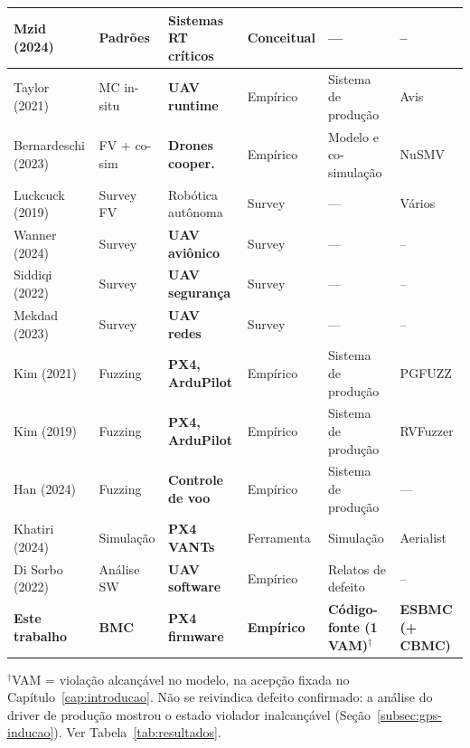 \begin{table}[p]
\begin{tabular}{|p{2.5cm}|p{2.0cm}|p{2.2cm}|p{1.7cm}|p{2.1cm}|p{1.6cm}|}
Mzid (2024)         & Padrões         & Sistemas RT críticos    & Conceitual & ---                   & --        \\ \hline
Taylor (2021)       & MC in-situ      & \textbf{UAV runtime}    & Empírico   & Sistema de produção   & Avis      \\ \hline
Bernardeschi (2023) & FV + co-sim     & \textbf{Drones cooper.} & Empírico   & Modelo e co-simulação & NuSMV     \\ \hline
Luckcuck (2019)     & Survey FV       & Robótica autônoma       & Survey     & ---                   & Vários    \\ \hline
Wanner (2024)       & Survey          & \textbf{UAV aviônico}   & Survey     & ---                   & --        \\ \hline
Siddiqi (2022)      & Survey          & \textbf{UAV segurança}  & Survey     & ---                   & --        \\ \hline
Mekdad (2023)       & Survey          & \textbf{UAV redes}      & Survey     & ---                   & --        \\ \hline
Kim (2021)          & Fuzzing         & \textbf{PX4, ArduPilot} & Empírico   & Sistema de produção   & PGFUZZ    \\ \hline
Kim (2019)          & Fuzzing         & \textbf{PX4, ArduPilot} & Empírico   & Sistema de produção   & RVFuzzer  \\ \hline
Han (2024)          & Fuzzing         & \textbf{Controle de voo}& Empírico   & Sistema de produção   & ---       \\ \hline
Khatiri (2024)      & Simulação       & \textbf{PX4 VANTs}      & Ferramenta & Simulação             & Aerialist \\ \hline
Di Sorbo (2022)     & Análise SW      & \textbf{UAV software}   & Empírico   & Relatos de defeito    & --        \\ \hline
\textbf{Este trabalho} & \textbf{BMC} & \textbf{PX4 firmware}   & \textbf{Empírico} & \textbf{Código-fonte (1 VAM)$^\dagger$} & \textbf{ESBMC (+ CBMC)} \\ \hline
\end{tabular}

\scriptsize
\begin{flushleft}
$^\dagger$VAM = violação alcançável no modelo, na acepção fixada no
Capítulo~\ref{cap:introducao}. Não se reivindica defeito confirmado: a análise do
driver de produção mostrou o estado violador inalcançável
(Seção~\ref{subsec:gps-inducao}). Ver Tabela~\ref{tab:resultados}.
\end{flushleft}
\end{table}

